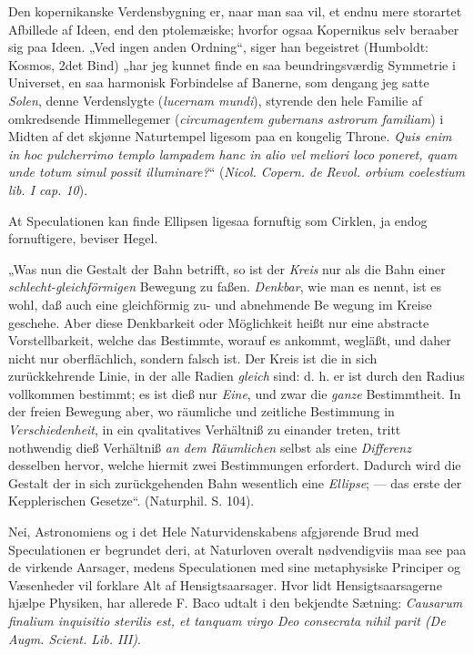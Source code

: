 \documentclass[12pt]{book}
\newcommand{\opage}[1]{\marginnote{\footnotesize\textit{[#1]}}}
\begin{document}
Den kopernikanske Verdensbygning er, naar man saa vil, et endnu mere storartet
Afbillede af Ideen, end den ptolemæiske; hvorfor ogsaa Kopernikus selv beraaber
sig paa Ideen. „Ved ingen anden Ordning“, siger han begeistret (Humboldt:
Kosmos, 2det Bind) „har jeg kunnet finde en saa beundringsværdig Symmetrie i
Universet, en saa harmonisk Forbindelse af Banerne, som dengang jeg satte
\emph{Solen}, denne Verdenslygte (\textit{lucernam mundi}), styrende den hele
Familie af omkredsende Himmellegemer (\textit{circumagentem gubernans astrorum
familiam}) i Midten af det skjønne Naturtempel ligesom paa en kongelig Throne.
\textit{Quis enim in hoc pulcherrimo templo lampadem hanc in alio vel meliori
loco poneret, quam unde totum simul possit illuminare?}“ (\textit{Nicol. Copern.
de Revol. orbium coelestium lib. I cap. 10}).

At Speculationen kan finde Ellipsen ligesaa fornuftig som Cirklen, ja endog
fornuftigere, beviser Hegel.

„Was nun die Gestalt der Bahn betrifft, so ist der \emph{Kreis} nur als die Bahn
einer \emph{schlecht-gleichförmigen} Bewegung zu faßen. \emph{Denkbar}, wie man
es nennt, ist es wohl, daß auch eine gleichförmig zu- und abnehmende Be%
\opage{169}wegung im Kreise geschehe. Aber diese Denkbarkeit oder Möglichkeit heißt nur eine
abstracte Vorstellbarkeit, welche das Bestimmte, worauf es ankommt, wegläßt, und
daher nicht nur oberflächlich, sondern falsch ist. Der Kreis ist die in sich
zurückkehrende Linie, in der alle Radien \emph{gleich} sind: d. h. er ist durch
den Radius vollkommen bestimmt; es ist dieß nur \emph{Eine}, und zwar die
\emph{ganze} Bestimmtheit. In der freien Bewegung aber, wo räumliche und
zeitliche Bestimmung in \emph{Verschiedenheit}, in ein qvalitatives Verhältniß zu
einander treten, tritt nothwendig dieß Verhältniß \emph{an dem Räumlichen} selbst
als eine \emph{Differenz} desselben hervor, welche hiermit zwei Bestimmungen
erfordert. Dadurch wird die Gestalt der in sich zurückgehenden Bahn wesentlich
eine \emph{Ellipse}; --- das erste der Kepplerischen Gesetze“. (Naturphil. S.
104).

Nei, Astronomiens og i det Hele Naturvidenskabens afgjørende Brud med
Speculationen er begrundet deri, at Naturloven overalt nødvendigviis maa see paa
de virkende Aarsager, medens Speculationen med sine metaphysiske Principer og
Væsenheder vil forklare Alt af Hensigtsaarsager. Hvor lidt Hensigtsaarsagerne
hjælpe Physiken, har allerede F. Baco udtalt i den bekjendte Sætning:
\textit{Causarum finalium inquisitio sterilis est, et tanquam virgo Deo consecrata
nihil parit (De Augm. Scient. Lib. III)}.
\end{document}
